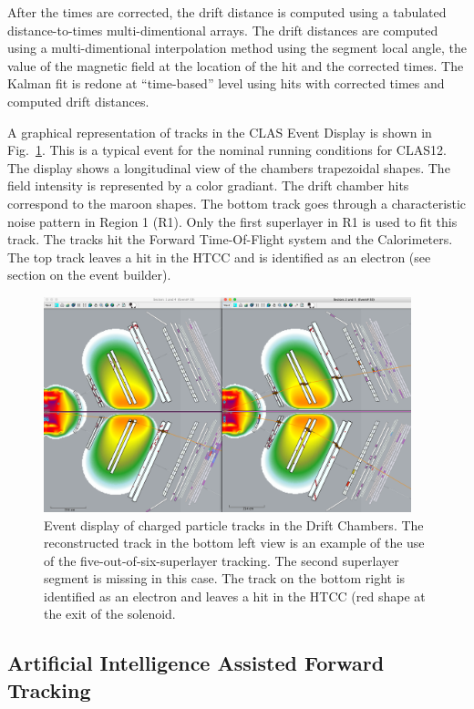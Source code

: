 After the times are corrected, the drift distance is computed using a tabulated distance-to-times
multi-dimentional arrays.  The drift distances are computed using a multi-dimentional interpolation method
using the segment local angle, the value of the magnetic field at the location of the hit and the corrected
times.  The Kalman fit is redone at ``time-based'' level using hits with corrected times and computed drift
distances.

A graphical representation of tracks in the CLAS Event Display is shown in Fig.~\ref{fig:dcTracks}.  
This is a typical event for the nominal running conditions for CLAS12.  The
display shows a longitudinal view of the chambers trapezoidal shapes. The field intensity is represented by a
color gradiant. The drift chamber hits correspond to the maroon shapes.  The bottom track goes through a
characteristic noise pattern in Region 1 (R1). Only the first superlayer in R1 is used to fit this track.  The
tracks hit the Forward Time-Of-Flight system and the Calorimeters.  The top track leaves a hit in the HTCC
and is identified as an electron (see section on the event builder).

\begin{figure}
\centering
\includegraphics[width=0.95\textwidth]{pics/dcTrack3.png}
\caption{Event display of charged particle tracks in the Drift Chambers.  The reconstructed 
track in the bottom left view is an example of the use of the five-out-of-six-superlayer tracking. 
The second superlayer segment is missing in this case.  The track on the bottom right is identified 
as an electron and leaves a hit in the HTCC (red shape at the exit of the solenoid. 
}
\label{fig:dcTracks}
\end{figure}

\subsection{Artificial Intelligence Assisted Forward Tracking}
